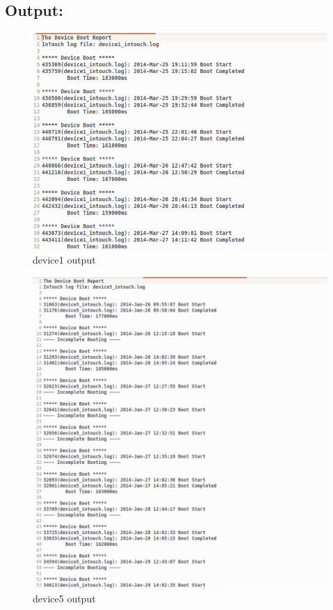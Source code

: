 \subsection{Output:}
\begin{figure}[h]
   \centering
    \includegraphics[width=1\textwidth]{ps7/d1.png}
    \caption{device1 output}
    \label{fig:ps7d1}
\end{figure}
\begin{figure}[h]
   \centering
    \includegraphics[width=1\textwidth]{ps7/d5.png}
    \caption{device5 output}
    \label{fig:ps7d5}
\end{figure}
